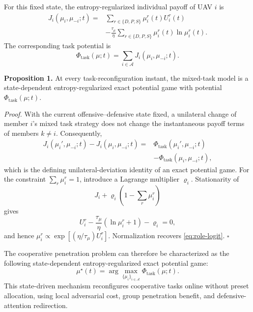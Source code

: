 \documentclass{cja}
\begin{document}
For this fixed state, the entropy-regularized individual payoff of UAV $i$ is
\begin{equation}
\begin{aligned}
J_i(\mu_i,\mu_{-i};t)
={}&
\sum_{r\in\{D,P,S\}}\mu_i^r(t)U_i^r(t)\\
&-\frac{\tau_\mu}{\eta}
\sum_{r\in\{D,P,S\}}\mu_i^r(t)\ln\mu_i^r(t).
\end{aligned}
\end{equation}
The corresponding task potential is
\begin{equation}
\Phi_{\mathrm{task}}(\mu;t)
=
\sum_{i\in\mathcal A}J_i(\mu_i,\mu_{-i};t).
\end{equation}

\noindent\textbf{Proposition 1.} At every task-reconfiguration instant, the mixed-task model is a state-dependent entropy-regularized exact potential game with potential $\Phi_{\mathrm{task}}(\mu;t)$.

\noindent\textit{Proof.} With the current offensive--defensive state fixed, a unilateral change of member $i$'s mixed task strategy does not change the instantaneous payoff terms of members $k\ne i$. Consequently,
\begin{equation}
\begin{aligned}
J_i(\mu_i',\mu_{-i};t)-J_i(\mu_i,\mu_{-i};t)
={}&\Phi_{\mathrm{task}}(\mu_i',\mu_{-i};t)\\
&-\Phi_{\mathrm{task}}(\mu_i,\mu_{-i};t),
\end{aligned}
\end{equation}
which is the defining unilateral-deviation identity of an exact potential game. For the constraint $\sum_r\mu_i^r=1$, introduce a Lagrange multiplier $\varrho_i$. Stationarity of
\begin{equation*}
J_i+\varrho_i\left(1-\sum_r\mu_i^r\right)
\end{equation*}
gives
\begin{equation*}
U_i^r-\frac{\tau_\mu}{\eta}\left(\ln\mu_i^r+1\right)-\varrho_i=0,
\end{equation*}
and hence $\mu_i^r\propto\exp[(\eta/\tau_\mu)U_i^r]$. Normalization recovers \eqref{eq:role-logit}. \hfill$\square$

The cooperative penetration problem can therefore be characterized as the following state-dependent entropy-regularized exact potential game:
\begin{equation}
\mu^{\star}(t)
=
\arg\max_{\{\mu_i\}_{i\in\mathcal{A}}}
\Phi_{\mathrm{task}}(\mu;t).
\end{equation}
This state-driven mechanism reconfigures cooperative tasks online without preset allocation, using local adversarial cost, group penetration benefit, and defensive-attention redirection.
\end{document}
